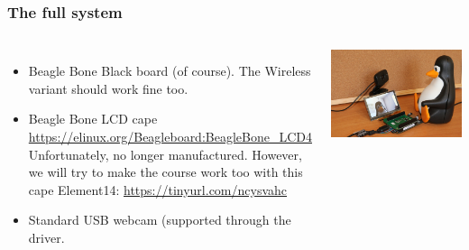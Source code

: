 \begin{frame}
  \frametitle{The full system}
  \begin{columns}
    \begin{itemize}
	\item Beagle Bone Black board (of course). The Wireless variant
	      should work fine too.
	\item Beagle Bone LCD cape\\
              \url{https://elinux.org/Beagleboard:BeagleBone_LCD4}\\
	      Unfortunately, no longer manufactured. However, we will
              try to make the course work too with this cape Element14:
              \url{https://tinyurl.com/ncysvahc}
        \item Standard USB webcam (supported through the 
	      driver.
    \end{itemize}
     \includegraphics[width=\textwidth]{common/beaglecam.jpg}
  \end{columns}
\end{frame}



